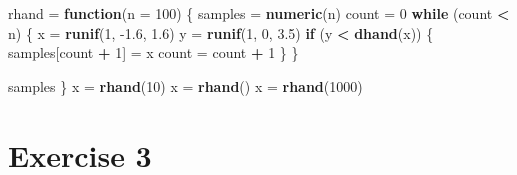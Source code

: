 \documentclass[
]{article}
\newenvironment{Shaded}{\begin{snugshade}}{\end{snugshade}}
\newcommand{\ControlFlowTok}[1]{\textcolor[rgb]{0.13,0.29,0.53}{\textbf{#1}}}
\newcommand{\DataTypeTok}[1]{\textcolor[rgb]{0.13,0.29,0.53}{#1}}
\newcommand{\DecValTok}[1]{\textcolor[rgb]{0.00,0.00,0.81}{#1}}
\newcommand{\FloatTok}[1]{\textcolor[rgb]{0.00,0.00,0.81}{#1}}
\newcommand{\KeywordTok}[1]{\textcolor[rgb]{0.13,0.29,0.53}{\textbf{#1}}}
\newcommand{\NormalTok}[1]{#1}
\newcommand{\OperatorTok}[1]{\textcolor[rgb]{0.81,0.36,0.00}{\textbf{#1}}}
\newcommand{\StringTok}[1]{\textcolor[rgb]{0.31,0.60,0.02}{#1}}
\begin{document}
\begin{Shaded}
\begin{Highlighting}[]
\NormalTok{rhand =}\StringTok{ }\ControlFlowTok{function}\NormalTok{(}\DataTypeTok{n =} \DecValTok{100}\NormalTok{) \{}
\NormalTok{   samples =}\StringTok{ }\KeywordTok{numeric}\NormalTok{(n)}
\NormalTok{   count =}\StringTok{ }\DecValTok{0}
   \ControlFlowTok{while}\NormalTok{ (count }\OperatorTok{\textless{}}\StringTok{ }\NormalTok{n) \{}
\NormalTok{      x =}\StringTok{ }\KeywordTok{runif}\NormalTok{(}\DecValTok{1}\NormalTok{, }\FloatTok{{-}1.6}\NormalTok{, }\FloatTok{1.6}\NormalTok{)}
\NormalTok{      y =}\StringTok{ }\KeywordTok{runif}\NormalTok{(}\DecValTok{1}\NormalTok{, }\DecValTok{0}\NormalTok{, }\FloatTok{3.5}\NormalTok{)}
      \ControlFlowTok{if}\NormalTok{ (y }\OperatorTok{\textless{}}\StringTok{ }\KeywordTok{dhand}\NormalTok{(x)) \{}
\NormalTok{         samples[count }\OperatorTok{+}\StringTok{ }\DecValTok{1}\NormalTok{] =}\StringTok{ }\NormalTok{x}
\NormalTok{         count =}\StringTok{ }\NormalTok{count }\OperatorTok{+}\StringTok{ }\DecValTok{1}
\NormalTok{      \}}
\NormalTok{   \}}

\NormalTok{   samples}
\NormalTok{\}}
\NormalTok{x =}\StringTok{ }\KeywordTok{rhand}\NormalTok{(}\DecValTok{10}\NormalTok{)}
\NormalTok{x =}\StringTok{ }\KeywordTok{rhand}\NormalTok{()}
\NormalTok{x =}\StringTok{ }\KeywordTok{rhand}\NormalTok{(}\DecValTok{1000}\NormalTok{)}
\end{Highlighting}
\end{Shaded}

\hypertarget{exercise-3}{%
\section{Exercise 3}\label{exercise-3}}
\end{document}
